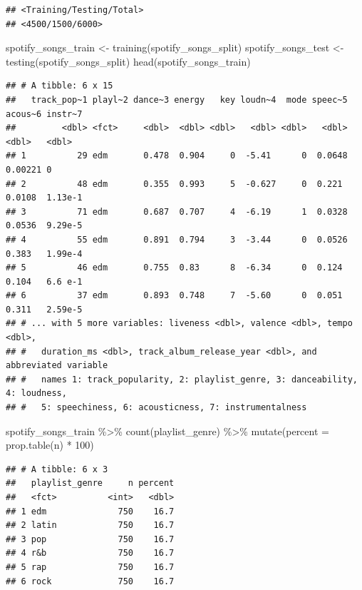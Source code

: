 \documentclass[
]{article}
\newenvironment{Shaded}{\begin{snugshade}}{\end{snugshade}}
\newcommand{\AttributeTok}[1]{\textcolor[rgb]{0.77,0.63,0.00}{#1}}
\newcommand{\DecValTok}[1]{\textcolor[rgb]{0.00,0.00,0.81}{#1}}
\newcommand{\FunctionTok}[1]{\textcolor[rgb]{0.00,0.00,0.00}{#1}}
\newcommand{\NormalTok}[1]{#1}
\newcommand{\OtherTok}[1]{\textcolor[rgb]{0.56,0.35,0.01}{#1}}
\newcommand{\SpecialCharTok}[1]{\textcolor[rgb]{0.00,0.00,0.00}{#1}}
\begin{document}
\begin{verbatim}
## <Training/Testing/Total>
## <4500/1500/6000>
\end{verbatim}

\begin{Shaded}
\begin{Highlighting}[]
\NormalTok{spotify\_songs\_train }\OtherTok{\textless{}{-}} \FunctionTok{training}\NormalTok{(spotify\_songs\_split)}
\NormalTok{spotify\_songs\_test }\OtherTok{\textless{}{-}} \FunctionTok{testing}\NormalTok{(spotify\_songs\_split)}
\FunctionTok{head}\NormalTok{(spotify\_songs\_train)}
\end{Highlighting}
\end{Shaded}

\begin{verbatim}
## # A tibble: 6 x 15
##   track_pop~1 playl~2 dance~3 energy   key loudn~4  mode speec~5 acous~6 instr~7
##         <dbl> <fct>     <dbl>  <dbl> <dbl>   <dbl> <dbl>   <dbl>   <dbl>   <dbl>
## 1          29 edm       0.478  0.904     0  -5.41      0  0.0648 0.00221 0      
## 2          48 edm       0.355  0.993     5  -0.627     0  0.221  0.0108  1.13e-1
## 3          71 edm       0.687  0.707     4  -6.19      1  0.0328 0.0536  9.29e-5
## 4          55 edm       0.891  0.794     3  -3.44      0  0.0526 0.383   1.99e-4
## 5          46 edm       0.755  0.83      8  -6.34      0  0.124  0.104   6.6 e-1
## 6          37 edm       0.893  0.748     7  -5.60      0  0.051  0.311   2.59e-5
## # ... with 5 more variables: liveness <dbl>, valence <dbl>, tempo <dbl>,
## #   duration_ms <dbl>, track_album_release_year <dbl>, and abbreviated variable
## #   names 1: track_popularity, 2: playlist_genre, 3: danceability, 4: loudness,
## #   5: speechiness, 6: acousticness, 7: instrumentalness
\end{verbatim}

\begin{Shaded}
\begin{Highlighting}[]
\NormalTok{spotify\_songs\_train }\SpecialCharTok{\%\textgreater{}\%} \FunctionTok{count}\NormalTok{(playlist\_genre) }\SpecialCharTok{\%\textgreater{}\%}
  \FunctionTok{mutate}\NormalTok{(}\AttributeTok{percent =} \FunctionTok{prop.table}\NormalTok{(n) }\SpecialCharTok{*} \DecValTok{100}\NormalTok{)}
\end{Highlighting}
\end{Shaded}

\begin{verbatim}
## # A tibble: 6 x 3
##   playlist_genre     n percent
##   <fct>          <int>   <dbl>
## 1 edm              750    16.7
## 2 latin            750    16.7
## 3 pop              750    16.7
## 4 r&b              750    16.7
## 5 rap              750    16.7
## 6 rock             750    16.7
\end{verbatim}
\end{document}
